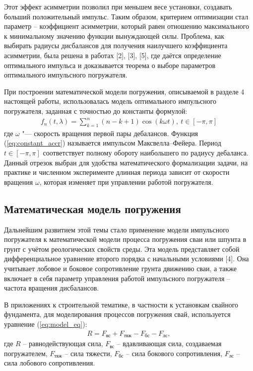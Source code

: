 Этот эффект асимметрии позволил при меньшем весе установки, создавать больший положительный импульс. Таким образом, критерием
оптимизации стал параметр – коэффициент асимметрии, который равен отношению максимального к минимальному значению функции
вынуждающей силы. Проблема, как выбирать радиусы дисбалансов для получения наилучшего коэффициента асимметрии, была решена в работах [2],
[3], [5], где даётся определение оптимального импульса и доказывается теорема о выборе параметров оптимального импульсного погружателя.

При построении математической модели погружения, описываемой в разделе 4 настоящей работы, использовалась модель оптимального
импульсного погружателя, заданная с точностью до константы формулой:
\begin{equation}\label{eq:constant_accr}
    \begin{gathered}
        f_n(t,\lambda) = \sum\limits_{k = 1}^n (n-k+1) \cos(k \omega t), \ t \in [-\pi, \pi]
    \end{gathered}
\end{equation}
\noindent где $\omega$ "--- скорость вращения первой пары дебалансов. Функция (\ref{eq:constant_accr}) называется импульсом Максвелла–Фейера.
Период $t \in [-\pi, \pi]$ соответствует полному обороту наибольшего по радиусу дебаланса. Данный отрезок выбран для
удобства математического формализации задачи, на практике и численном эксперименте длинная периода зависит от скорости вращения $\omega$,
которая изменяет при управлении работой погружателя.

\subsection{Математическая модель погружения}

Дальнейшим развитием этой темы стало применение модели импульсного погружателя к математической модели процесса погружения
сваи или шпунта в грунт с учётом реологических свойств среды. Эта модель представляет собой дифференциальное уравнение второго порядка с
начальными условиями [4]. Она учитывает лобовое и боковое сопротивление грунта движению сваи, а также включает в себя параметр управления работой
импульсного погружателя – частота вращения дисбалансов.

В приложениях к строительной тематике, в частности к установкам свайного фундамента, для моделирования процессов погружения свай, используется уравнение (\ref{eq:model_eq}):
\begin{equation}\label{eq:model_eq}
    \begin{gathered}
        R = F_{\textrm{вс}} + F_{\textrm{тяж}} - F_{\textrm{бс}} - F_{\textrm{лс}},
    \end{gathered}
\end{equation}
\noindent где $R$ – равнодействующая сила, $F_{\textrm{вс}}$ – вдавливающая сила, создаваемая погружателем, $F_{\textrm{тяж}}$ – сила тяжести, $F_{\textrm{бс}}$ – сила бокового сопротивления, $F_{\textrm{лс}}$ – сила лобового сопротивления.

